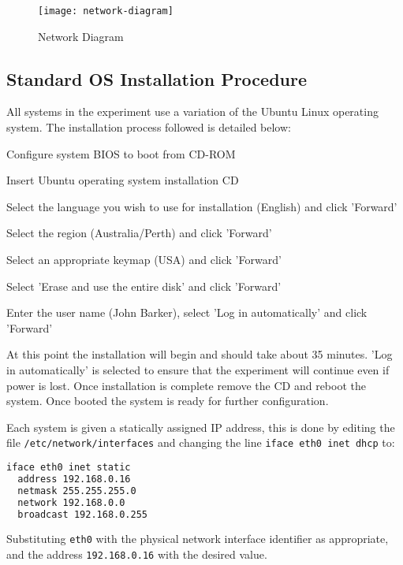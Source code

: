 \begin{figure}[H]
  \centering\texttt{[image: network-diagram]}
  \caption{Network Diagram}
  \label{network-diagram}
\end{figure}

\subsection{Standard OS Installation Procedure}
\label{section:os_install}

All systems in the experiment use a variation of the Ubuntu Linux operating
system. The installation process followed is detailed below:

\begin{enumerate*}
  \item Configure system BIOS to boot from CD-ROM
  \item Insert Ubuntu operating system installation CD
  \item Select the language you wish to use for installation (English) and click
    'Forward'
  \item Select the region (Australia/Perth) and click 'Forward'
  \item Select an appropriate keymap (USA) and click 'Forward'
  \item Select 'Erase and use the entire disk' and click 'Forward'
  \item Enter the user name (John Barker), select 'Log in automatically' and click 'Forward'
\end{enumerate*}

At this point the installation will begin and should take about 35 minutes.
'Log in automatically' is selected to ensure that the experiment will continue
even if power is lost. Once installation is complete remove the CD and reboot
the system. Once booted the system is ready for further configuration.

Each system is given a statically assigned IP address, this is done by editing
the file \verb+/etc/network/interfaces+ and changing the line \verb+iface eth0 inet dhcp+
to:

\begin{lstlisting}[language=sh]
iface eth0 inet static
  address 192.168.0.16
  netmask 255.255.255.0
  network 192.168.0.0
  broadcast 192.168.0.255
\end{lstlisting}

Substituting \verb+eth0+ with the physical network interface identifier as
appropriate, and the address \verb+192.168.0.16+ with the desired value.


